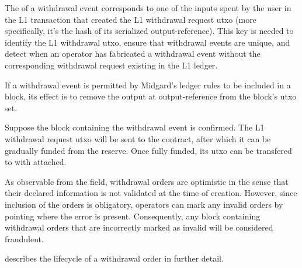 \documentclass[../midgard.tex]{subfiles}
\begin{document}
The  of a withdrawal event corresponds to one of the inputs spent by the user in the L1 transaction that created the L1 withdrawal request utxo (more specifically, it's the hash of its serialized output-reference).
This key is needed to identify the L1 withdrawal utxo, ensure that withdrawal events are unique, and detect when an operator has fabricated a withdrawal event without the corresponding withdrawal request existing in the L1 ledger.

If a withdrawal event is permitted by Midgard's ledger rules to be included in a block, its effect is to remove the output at output-reference  from the block's utxo set.

Suppose the block containing the withdrawal event is confirmed.
The L1 withdrawal request utxo will be sent to the  contract, after which it can be gradually funded from the reserve. Once fully funded, its utxo can be transfered to  with  attached.

As observable from the  field, withdrawal orders are optimistic in the sense that their declared information is not validated at the time of creation.
However, since inclusion of the orders is obligatory, operators can mark any invalid orders by pointing where the error is present.
Consequently, any block containing withdrawal orders that are incorrectly marked as invalid will be considered fraudulent.

 describes the lifecycle of a withdrawal order in further detail.
\end{document}
